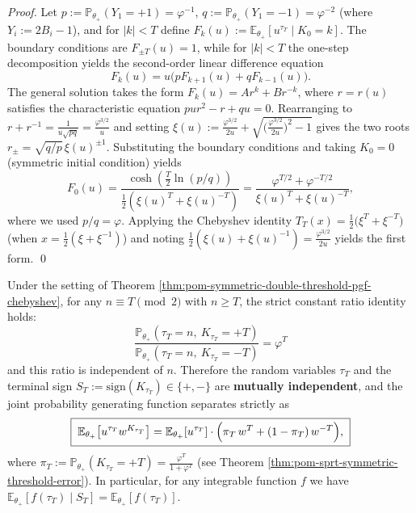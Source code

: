 \begin{proof}
Let \(p:=\mathbb{P}_{\theta_+}(Y_1=+1)=\varphi^{-1}\), \(q:=\mathbb{P}_{\theta_+}(Y_1=-1)=\varphi^{-2}\) (where \(Y_i:=2B_i-1\)), and for \(|k|<T\) define
\(
F_k(u):=\mathbb{E}_{\theta_+}[u^{\tau_T}\mid K_0=k]
\).
The boundary conditions are \(F_{\pm T}(u)=1\), while for \(|k|<T\) the one-step decomposition yields the second-order linear difference equation
\[
F_k(u)=u\bigl(pF_{k+1}(u)+qF_{k-1}(u)\bigr).
\]
The general solution takes the form \(F_k(u)=A r^k+B r^{-k}\), where \(r=r(u)\) satisfies the characteristic equation
\(
pu r^2-r+qu=0
\).
Rearranging to
\(
r+r^{-1}=\frac{1}{u\sqrt{pq}}=\frac{\varphi^{3/2}}{u}
\)
and setting
\(
\xi(u):=\frac{\varphi^{3/2}}{2u}+\sqrt{\bigl(\frac{\varphi^{3/2}}{2u}\bigr)^2-1}
\)
gives the two roots
\(
r_\pm=\sqrt{q/p}\,\xi(u)^{\pm 1}
\).
Substituting the boundary conditions and taking \(K_0=0\) (symmetric initial condition) yields
\[
F_0(u)=\frac{\cosh(\tfrac{T}{2}\ln(p/q))}{\frac12(\xi(u)^T+\xi(u)^{-T})}
=\frac{\varphi^{T/2}+\varphi^{-T/2}}{\xi(u)^T+\xi(u)^{-T}},
\]
where we used \(p/q=\varphi\). Applying the Chebyshev identity
\(
T_T(x)=\frac12\bigl(\xi^T+\xi^{-T}\bigr)
\)
(when \(x=\frac12(\xi+\xi^{-1})\)) and noting
\(
\frac12(\xi(u)+\xi(u)^{-1})=\frac{\varphi^{3/2}}{2u}
\)
yields the first form. \qed
\end{proof}

\begin{proposition}\label{prop:pom-tau-terminal-sign-independence}
Under the setting of Theorem \ref{thm:pom-symmetric-double-threshold-pgf-chebyshev},
for any \(n\equiv T\pmod 2\) with \(n\ge T\), the strict constant ratio identity holds:
\[
\boxed{\;
\frac{\mathbb{P}_{\theta_+}(\tau_T=n,\ K_{\tau_T}=+T)}{\mathbb{P}_{\theta_+}(\tau_T=n,\ K_{\tau_T}=-T)}=\varphi^{T}\; }
\]
and this ratio is independent of \(n\).
Therefore the random variables \(\tau_T\) and the terminal sign
\(
S_T:=\mathrm{sign}(K_{\tau_T})\in\{+,-\}
\)
are \textbf{mutually independent}, and the joint probability generating function separates strictly as
\[
\boxed{\;
\mathbb{E}_{\theta_+}\!\left[u^{\tau_T}w^{K_{\tau_T}}\right]
=\mathbb{E}_{\theta_+}[u^{\tau_T}]\cdot\Bigl(\pi_T\,w^{T}+(1-\pi_T)\,w^{-T}\Bigr),\;}
\]
where
\(
\pi_T:=\mathbb{P}_{\theta_+}(K_{\tau_T}=+T)=\frac{\varphi^{T}}{1+\varphi^{T}}
\)
(see Theorem \ref{thm:pom-sprt-symmetric-threshold-error}).
In particular, for any integrable function \(f\) we have
\(
\mathbb{E}_{\theta_+}[f(\tau_T)\mid S_T]=\mathbb{E}_{\theta_+}[f(\tau_T)]
\).
\end{proposition}

